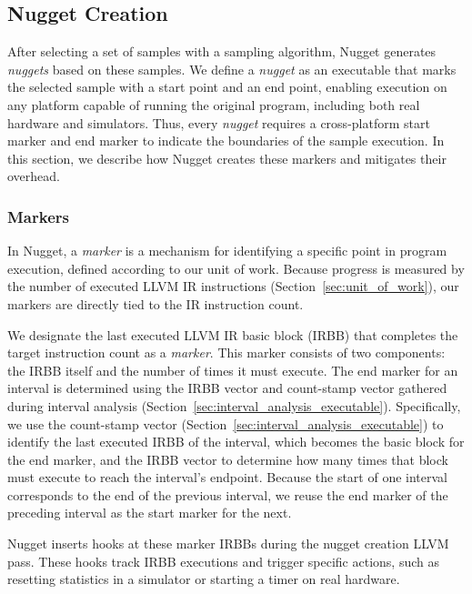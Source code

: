 \subsection{Nugget Creation}\label{sec:nugget_creation}

After selecting a set of samples with a sampling algorithm, Nugget generates \emph{nuggets} based on these samples.
We define a \emph{nugget} as an executable that marks the selected sample with a start point and an end point, enabling execution on any platform capable of running the original program, including both real hardware and simulators.
Thus, every \emph{nugget} requires a cross-platform start marker and end marker to indicate the boundaries of the sample execution.
In this section, we describe how Nugget creates these markers and mitigates their overhead.

\subsubsection{Markers}\label{sec:markers}

In Nugget, a \emph{marker} is a mechanism for identifying a specific point in program execution, defined according to our unit of work.
Because progress is measured by the number of executed LLVM IR instructions (Section~\ref{sec:unit_of_work}), our markers are directly tied to the IR instruction count.

We designate the last executed LLVM IR basic block (IRBB) that completes the target instruction count as a \emph{marker}.
This marker consists of two components: the IRBB itself and the number of times it must execute. 
The end marker for an interval is determined using the IRBB vector and count-stamp vector gathered during interval analysis (Section~\ref{sec:interval_analysis_executable}).
Specifically, we use the count-stamp vector (Section~\ref{sec:interval_analysis_executable}) to identify the last executed IRBB of the interval, which becomes the basic block for the end marker, and the IRBB vector to determine how many times that block must execute to reach the interval's endpoint.
Because the start of one interval corresponds to the end of the previous interval, we reuse the end marker of the preceding interval as the start marker for the next.

Nugget inserts hooks at these marker IRBBs during the nugget creation LLVM pass.
These hooks track IRBB executions and trigger specific actions, such as resetting statistics in a simulator or starting a timer on real hardware.

